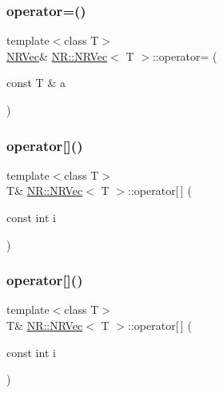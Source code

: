 \mbox{\label{classNR_1_1NRVec_af2d6c1894e28979a9c758a2f103832ee}} 
\subsubsection{\texorpdfstring{operator=()}{operator=()}\hspace{0.1cm}{\footnotesize\ttfamily [6/6]}}
{\footnotesize\ttfamily template$<$class T$>$ \\
\mbox{\hyperlink{classNR_1_1NRVec}{N\+R\+Vec}}\& \mbox{\hyperlink{classNR_1_1NRVec}{N\+R\+::\+N\+R\+Vec}}$<$ T $>$\+::operator= (\begin{DoxyParamCaption}\item[{const T \&}]{a }\end{DoxyParamCaption})}

\mbox{\label{classNR_1_1NRVec_aa06286b2b6a9a51dd275d17c1b777bed}} 
\subsubsection{\texorpdfstring{operator[]()}{operator[]()}\hspace{0.1cm}{\footnotesize\ttfamily [1/6]}}
{\footnotesize\ttfamily template$<$class T$>$ \\
T\& \mbox{\hyperlink{classNR_1_1NRVec}{N\+R\+::\+N\+R\+Vec}}$<$ T $>$\+::operator\mbox{[}$\,$\mbox{]} (\begin{DoxyParamCaption}\item[{const int}]{i }\end{DoxyParamCaption})\hspace{0.3cm}{\ttfamily [inline]}}

\mbox{\label{classNR_1_1NRVec_aa06286b2b6a9a51dd275d17c1b777bed}} 
\subsubsection{\texorpdfstring{operator[]()}{operator[]()}\hspace{0.1cm}{\footnotesize\ttfamily [2/6]}}
{\footnotesize\ttfamily template$<$class T$>$ \\
T\& \mbox{\hyperlink{classNR_1_1NRVec}{N\+R\+::\+N\+R\+Vec}}$<$ T $>$\+::operator\mbox{[}$\,$\mbox{]} (\begin{DoxyParamCaption}\item[{const int}]{i }\end{DoxyParamCaption})\hspace{0.3cm}{\ttfamily [inline]}}

